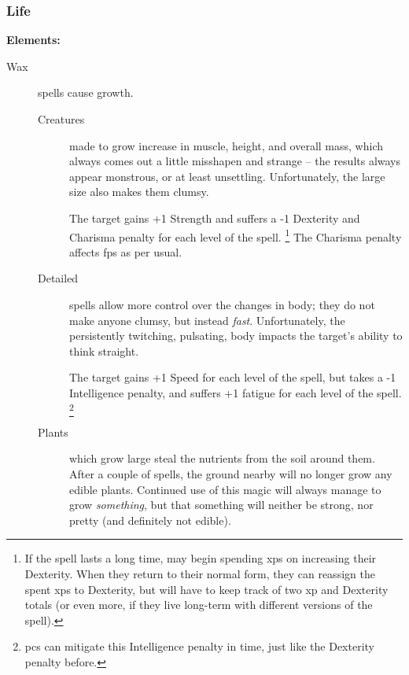 \begin{multicols}{2}
\subsubsection{Life}

\textbf{Elements:}

\begin{description}
  \item[Wax]
  spells cause growth.
    \begin{description}
      \item[Creatures]
        made to grow increase in muscle, height, and overall mass, which always comes out a little misshapen and strange -- the results always appear monstrous, or at least unsettling.
        Unfortunately, the large size also makes them clumsy.

        The target gains +1 Strength and suffers a -1 Dexterity and Charisma penalty for each level of the spell.%
        \footnote{If the spell lasts a long time,  may begin spending \glspl{xp} on increasing their Dexterity. When they return to their normal form, they can reassign the spent \glspl{xp} to Dexterity, but will have to keep track of two \gls{xp} and Dexterity totals (or even more, if they live long-term with different versions of the spell).}
        The Charisma penalty affects \glspl{fp} as per usual.
      \item[Detailed]
        spells allow more control over the changes in body; they do not make anyone clumsy, but instead \emph{fast}.
        Unfortunately, the persistently twitching, pulsating, body impacts the target's ability to think straight.

        The target gains +1 Speed for each level of the spell, but takes a -1 Intelligence penalty, and suffers +1 \gls{fatigue} for each level of the spell.%
        \footnote{\Glspl{pc} can mitigate this Intelligence penalty in time, just like the Dexterity penalty before.}
      \item[Plants]
        which grow large steal the nutrients from the soil around them.
        After a couple of spells, the ground nearby will no longer grow any edible plants.
        Continued use of this magic will always manage to grow \emph{something}, but that something will neither be strong, nor pretty (and definitely not edible).


\end{description}
\end{description}
\end{multicols}
